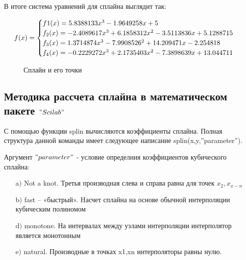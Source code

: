 \documentclass[russian,utf8,nocolumnxxxi,nocolumnxxxii]{eskdtext}
\begin{document}
\newpage
В итоге система уравнений для сплайна выглядит так:

\begin{equation*}
f(x) =
 \begin{cases}
 $$f1(x)=5.8388133x^3-1.9649258x+5$$ \\
 $$f_2(x)=-2.4089617x^3+6.1858312x^2-3.5113836x+5.1288715$$ \\
 $$f_3(x)=1.3714874x^3-7.9908526^2+14.209471x-2.254818$$ \\
 $$f_4(x)=-0.2229272x^3+2.1735403x^2-7.3898639x+13.044711$$
 \end{cases}
\end{equation*}

 \begin{figure}[h]
\centering
\caption{Сплайн и его точки}
   \end{figure}
   
   








\newpage
\subsection{Методика рассчета сплайна в математическом пакете $"Scilab"$}
С помощью функции splin вычисляются коэффициенты сплайна. Полная структура данной команды имеет следующее написание splin(x,y,”parameter”).

Аргумент $"parameter"$ - условие определния коэффициентов кубического сплайна:
\begin{enumerate}
  \item[a$)$] Not \makebox[0,3cm]{\hrulefill} a             \makebox[0,3cm]{\hrulefill} knot. Третья производная слева и справа равна для точек $x_2,x_{x-n}$
  \item[b$)$] fast – «быстрый». Hасчет сплайна на основе обычной интерполяции кубическим полиномом
  \item[d$)$] monotone. На интервалах между узлами интерполяции интерполятор является монотонным
  \item[e$)$] natural. Производные в точках x1,xn интерполяторы равны нулю.
\end{enumerate}
\end{document}
